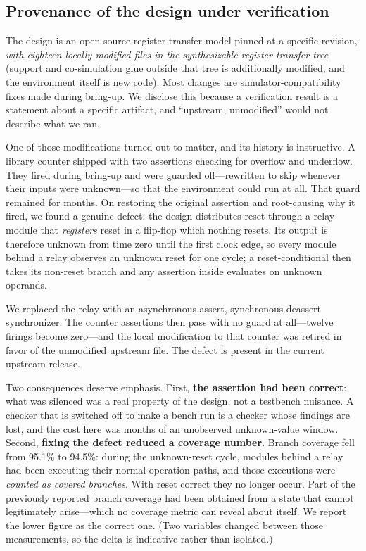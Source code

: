 \documentclass[conference]{IEEEtran}
\begin{document}

\subsection{Provenance of the design under verification}
\label{sec:provenance}

The design is an open-source register-transfer model pinned at a specific
revision, \emph{with eighteen locally modified files in the synthesizable
register-transfer tree} (support and co-simulation glue outside that tree
is additionally modified, and the environment itself is new code). Most changes are
simulator-compatibility fixes made during bring-up. We disclose this because a
verification result is a statement about a specific artifact, and ``upstream,
unmodified'' would not describe what we ran.

One of those modifications turned out to matter, and its history is instructive.
A library counter shipped with two assertions checking for overflow and
underflow. They fired during bring-up and were guarded off---rewritten to skip
whenever their inputs were unknown---so that the environment could run at all.
That guard remained for months. On restoring the original assertion and
root-causing why it fired, we found a genuine defect: the design distributes
reset through a relay module that \emph{registers} reset in a flip-flop which
nothing resets. Its output is therefore unknown from time zero until the first
clock edge, so every module behind a relay observes an unknown reset for one
cycle; a reset-conditional then takes its non-reset branch and any assertion
inside evaluates on unknown operands.

We replaced the relay with an asynchronous-assert, synchronous-deassert
synchronizer. The counter assertions then pass with no guard at all---twelve
firings become zero---and the local modification to that counter was retired in
favor of the unmodified upstream file. The defect is present in the current
upstream release.

Two consequences deserve emphasis. First, \textbf{the assertion had been
correct}: what was silenced was a real property of the design, not a testbench
nuisance. A checker that is switched off to make a bench run is a checker whose
findings are lost, and the cost here was months of an unobserved
unknown-value window. Second, \textbf{fixing the defect reduced a coverage
number}. Branch coverage fell from 95.1\% to 94.5\%: during the unknown-reset
cycle, modules behind a relay had been executing their normal-operation paths,
and those executions were \emph{counted as covered branches}. With reset
correct they no longer occur. Part of the previously reported branch coverage
had been obtained from a state that cannot legitimately arise---which no
coverage metric can reveal about itself. We report the lower figure as the
correct one. (Two variables changed between those measurements, so the delta is
indicative rather than isolated.)
\end{document}
